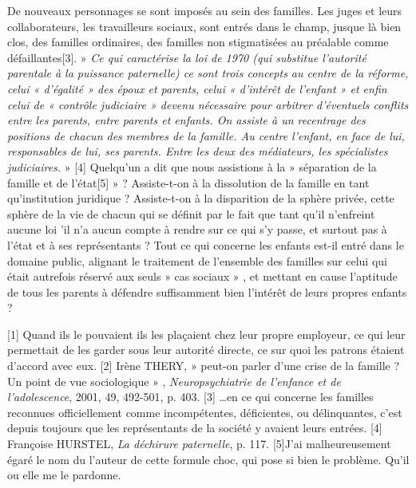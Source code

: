  De nouveaux personnages se sont imposés au sein des familles. Les juges et leurs collaborateurs, les travailleurs sociaux, sont entrés dans le champ, jusque là bien clos, des familles ordinaires, des familles non stigmatisées au préalable comme défaillantes[3]. » \emph{Ce qui caractérise la loi de 1970 (qui substitue l'autorité parentale à la puissance paternelle) ce sont trois concepts au centre de la réforme, celui « d'égalité » des époux et parents, celui « d'intérêt de l'enfant » et enfin celui de « contrôle judiciaire » devenu nécessaire pour arbitrer d'éventuels conflits entre les parents, entre parents et enfants. On assiste à un recentrage des positions de chacun des membres de la famille. Au centre l'enfant, en face de lui, responsables de lui, ses parents. Entre les deux des médiateurs, les spécialistes judiciaires.} » [4]
 Quelqu'un a dit que nous assistions à la » séparation de la famille et de l'état[5] » ? 
 Assiste-t-on à la dissolution de la famille en tant qu'institution juridique ? 
 Assiste-t-on à la disparition de la sphère privée, cette sphère de la vie de chacun qui se définit par le fait que tant qu'il n'enfreint aucune loi 'il n'a aucun compte à rendre sur ce qui s'y passe, et surtout pas à l'état et à ses représentants ? 
 Tout ce qui concerne les enfants est-il entré dans le domaine public, alignant le traitement de l'ensemble des familles sur celui qui était autrefois réservé aux seuls » cas sociaux » , et mettant en cause l'aptitude de tous les parents à défendre suffisamment bien l'intérêt de leurs propres enfants ? 
 
 
[1] Quand ils le pouvaient ils les plaçaient chez leur propre employeur, ce qui leur permettait de les garder sous leur autorité directe, ce sur quoi les patrons étaient d'accord avec eux.
[2] Irène THERY, » peut-on parler d'une crise de la famille ? Un point de vue sociologique » , \emph{Neuropsychiatrie de l'enfance et de l'adolescence}, 2001, 49, 492-501, p. 403.
[3] …en ce qui concerne les familles reconnues officiellement comme incompétentes, déficientes, ou délinquantes, c'est depuis toujours que les représentants de la société y avaient leurs entrées.
[4] Françoise HURSTEL, \emph{La déchirure paternelle}, p. 117.
[5]J'ai malheureusement égaré le nom du l'auteur de cette formule choc, qui pose si bien le problème. Qu'il ou elle me le pardonne.